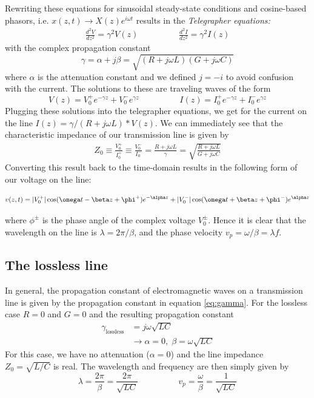 Rewriting these equations for sinusoidal steady-state conditions and cosine-based phasors, i.e. $x(z,t) \rightarrow X(z)e^{i\omega t}$ results in the \textit{Telegrapher equations:}
\begin{align}
\frac{d^2V}{dz^2} = \gamma^2V(z) \hspace{2cm} \frac{d^2I}{dz^2} = \gamma^2I(z)
\label{eq:telegraph}
\end{align}
with the complex propagation constant
\begin{equation}
\gamma = \alpha + j\beta =\sqrt{(R+j\omega L)(G+j\omega C)}
\label{eq:gamma}
\end{equation}
where $\alpha$ is the attenuation constant and we defined $j=-i$ to avoid confusion with the current.
The solutions to these are traveling waves of the form
\begin{equation}
V(z) = V_0^+e^{-\gamma z} + V_0^-e^{\gamma z} \hspace{2cm} I(z) = I_0^+e^{-\gamma z} + I_0^-e^{\gamma z}
\label{eq:telegraph:solution}
\end{equation}
Plugging these solutions into the telegrapher equations, we get for the current on the line $I(z)=\gamma/(R+j\omega L) * V(z)$.
We can immediately see that the characteristic impedance of our transmission line is given by
\begin{align}
Z_0 \equiv \frac{V_0^+}{I_0^+}\equiv \frac{V_0^-}{I_0^-}= \frac{R+j\omega L}{\gamma} = \sqrt{\frac{R+j\omega L}{G + j\omega C}}
\end{align}
Converting this result back to the time-domain results in the following form of our voltage on the line:

\begin{align}
v(z,t) = \abs{V_0^+}\cos(\omega t-\beta z+\phi^+)e^{-\alpha z} + \abs{V_0^-}\cos(\omega t+\beta z+\phi^-)e^{\alpha z}
\end{align}

where $\phi^{\pm}$ is the phase angle of the complex voltage $V_0^{\pm}$.
Hence it is clear that the wavelength on the line is $\lambda=2\pi/\beta$, and the phase velocity $v_p=\omega/\beta=\lambda f$.
\subsection{The lossless line}
In general, the propagation constant of electromagnetic waves on a transmission line is given by the propagation constant in equation \ref{eq:gamma}.
For the lossless case $R=0$ and $G=0$ and the resulting propagation constant
\begin{align}
\gamma_\mathrm{lossless} &= j\omega\sqrt{LC} \\%
&\rightarrow \alpha=0, \; \beta=\omega\sqrt{LC}
\end{align}
For this case, we have no attenuation ($\alpha=0$) and the line impedance $Z_0=\sqrt{L/C}$ is real.
The wavelength and frequency are then simply given by
\begin{equation}
\lambda = \frac{2\pi}{\beta} = \frac{2\pi}{\sqrt{LC}} \hspace{2cm} v_p=\frac{\omega}{\beta}=\frac{1}{\sqrt{LC}}
\end{equation}

